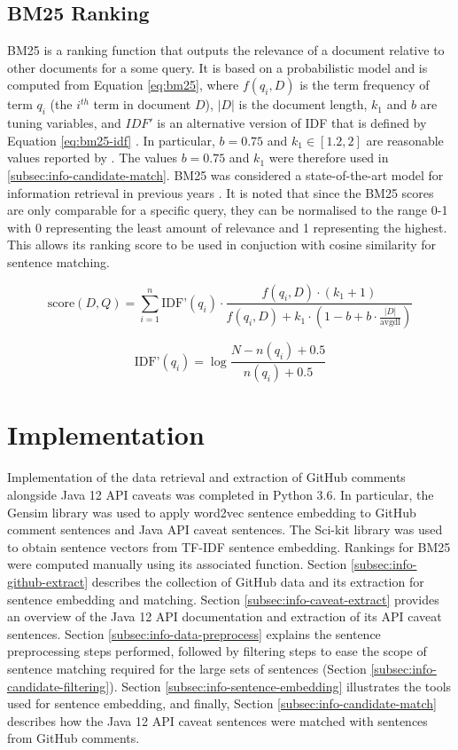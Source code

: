 \subsection{BM25 Ranking}
\label{subsec:info-bm25}
BM25 is a ranking function that outputs the relevance of a document relative to other documents for a some query. It is based on a probabilistic model and is computed from Equation \ref{eq:bm25}, where $f(q_i, D)$ is the term frequency of term $q_i$ (the $i^{th}$ term in document $D$), $|D|$ is the document length, $k_1$ and $b$ are tuning variables, and $IDF'$ is an alternative version of IDF that is defined by Equation \ref{eq:bm25-idf} \cite{Manning:2008:IIR:1394399}. In particular, $b=0.75$ and $k_1 \in [1.2,2]$ are reasonable values reported by \citeauthor{Manning:2008:IIR:1394399}. The values $b=0.75$ and $k_1$ were therefore used in \ref{subsec:info-candidate-match}. BM25 was considered a state-of-the-art model for information retrieval in previous years \cite{perez2009integrating}. It is noted that since the BM25 scores are only comparable for a specific query, they can be normalised to the range 0-1 with 0 representing the least amount of relevance and 1 representing the highest. This allows its ranking score to be used in conjuction with cosine similarity for sentence matching.

\begin{equation} \label{eq:bm25} 
\text{score}(D,Q) = \sum_{i=1}^{n} \text{IDF'}(q_i) \cdot \frac{f(q_i, D) \cdot (k_1 + 1)}{f(q_i, D) + k_1 \cdot (1 - b + b \cdot \frac{|D|}{\text{avgdl}})} 
\end{equation}

\begin{equation} \label{eq:bm25-idf} 
\text{IDF'}(q_i) = \log{\frac{N - n(q_i) + 0.5}{n(q_i) + 0.5}}
\end{equation}

\section{Implementation}
\label{sec:info-implement}
Implementation of the data retrieval and extraction of GitHub comments alongside Java 12 API caveats was completed in Python 3.6. In particular, the Gensim library was used to apply word2vec sentence embedding to GitHub comment sentences and Java API caveat sentences. The Sci-kit library was used to obtain sentence vectors from TF-IDF sentence embedding. Rankings for BM25 were computed manually using its associated function. Section \ref{subsec:info-github-extract} describes the collection of GitHub data and its extraction for sentence embedding and matching. Section \ref{subsec:info-caveat-extract} provides an overview of the Java 12 API documentation and extraction of its API caveat sentences. Section \ref{subsec:info-data-preprocess} explains the sentence preprocessing steps performed, followed by filtering steps to ease the scope of sentence matching required for the large sets of sentences (Section \ref{subsec:info-candidate-filtering}). Section \ref{subsec:info-sentence-embedding} illustrates the tools used for sentence embedding, and finally, Section \ref{subsec:info-candidate-match} describes how the Java 12 API caveat sentences were matched with sentences from GitHub comments.

